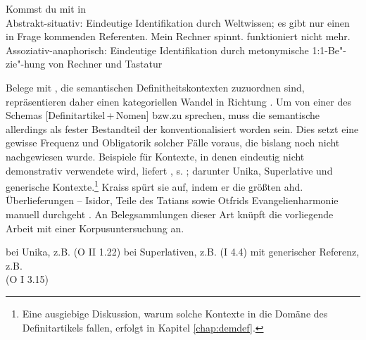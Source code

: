 \begin{exe}
	\ex 
	\begin{xlist} \label{ex:sem-def}\raggedright
		\ex \label{ex:sem-def1} Kommst du mit in  \\ Abstrakt-situativ: Eindeutige Identifikation durch Weltwissen; es gibt nur einen in Frage kommenden Referenten. 
		\ex \label{ex:sem-def2}  Mein Rechner spinnt.  funktioniert nicht mehr. \\ Assoziativ-anaphorisch: Eindeutige Identifikation durch metonymische  1:1-Be"-zie"-hung von Rechner und Tastatur
		\end{xlist}
\end{exe}
\noindent
Belege mit , die semantischen  Definitheitskontexten  zuzuordnen sind, repräsentieren daher einen kategoriellen Wandel in Richtung . Um von einer  des Schemas  [Definitartikel\,+\,Nomen]  bzw.\linebreak{} zu sprechen, muss die semantische 
 allerdings als fester Bestandteil der   konventionalisiert worden sein. Dies setzt eine gewisse Frequenz und Obligatorik solcher Fälle voraus, die bislang noch nicht nachgewiesen wurde. Beispiele für Kontexte, in denen  eindeutig nicht demonstrativ verwendete wird, liefert \textcite[135--137]{Kraiss2014}, s. ; darunter  Unika, Superlative  und generische  Kontexte.\footnote{Eine ausgiebige Diskussion, warum solche Kontexte in die Domäne des Definitartikels  fallen, erfolgt in Kapitel \ref{chap:demdef}.}  Kraiss spürt sie auf, indem er  die größten ahd. Überlieferungen -- Isidor, Teile des Tatians sowie Otfrids Evangelienharmonie manuell durchgeht \parencite{Kraiss2012}. An Belegsammlungen dieser Art \parencite[vgl. z.B. auch][]{Luhr2008,Schlachter2015} knüpft die vorliegende Arbeit mit einer Korpusuntersuchung  an.

\begin{exe}
	\ex 
	\begin{xlist} \label{ex:kraiss}
		\ex \label{ex:kraiss-unika}  bei  Unika, z.B.   (O II 1.22) 
		\ex \label{ex:kraiss-superlativ}  bei  Superlativen, z.B.   (I 4.4)
				\ex \label{ex:kraiss-generisch}  mit  generischer Referenz, z.B.  \\  (O I 3.15)
		\end{xlist}
\end{exe}

